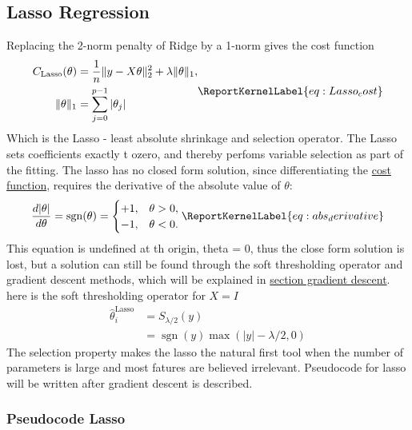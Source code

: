 \documentclass[aps,rmp,reprint,amsmath,amssymb,longbibliography]{revtex4-1}
\let\label\ReportKernelLabel
\begin{document}
\subsection{Lasso Regression}
Replacing the 2-norm penalty of Ridge by a 1-norm gives the cost function
\begin{equation}
  \begin{aligned}
  C_{\mathrm{Lasso}}(\theta)
  &= \frac{1}{n}\lVert y - X\theta\rVert_2^2 + \lambda\lVert\theta\rVert_1, \\
  \lVert\theta\rVert_1 &= \sum_{j=0}^{p-1}|\theta_j|
  \end{aligned}
\label{eq:Lasso_cost}
\end{equation}
Which is the Lasso - least absolute shrinkage and selection operator. The Lasso
sets coefficients exactly t ozero, and thereby perfoms variable selection as part of the fitting. \cite[p.~90]{LectureNotes}
The lasso has no closed form solution, since differentiating the \hyperref[eq:Lasso_cost]{cost function},
requires the derivative of the absolute value of $\theta$:
 \begin{equation}
\frac{d|\theta|}{d\theta}
= \operatorname{sgn}(\theta)
= \begin{cases}
+1, & \theta > 0, \\
-1, & \theta < 0.
\end{cases}
\label{eq:abs_derivative}
\end{equation}
This equation is undefined at th origin, theta = 0, thus the close form solution is lost,
but a solution can still be found through the soft thresholding operator and gradient descent methods,
which will be explained in \hyperref[sec:GD]{section gradient descent}.
here is the soft thresholding operator for $X=I$
\begin{equation}
  \begin{aligned}
  \hat{\theta}_i^{\mathrm{Lasso}} &= S_{\lambda/2}(y) \\
  &= \operatorname{sgn}(y)\max(|y| - \lambda/2, 0)
  \end{aligned}
\end{equation}
\cite[p.~91]{LectureNotes}
The selection property makes the lasso the natural first tool when the
number of parameters is large and most fatures are believed irrelevant.
Pseudocode for lasso will be written after gradient descent is described.

\subsubsection{Pseudocode Lasso}
\label{subsec:Lasso_Code}
\end{document}
